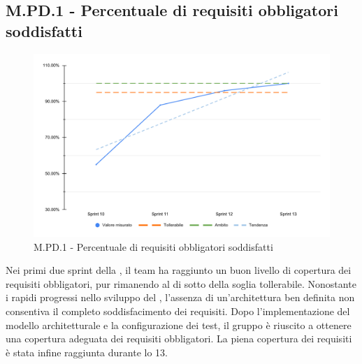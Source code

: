 \subsection{M.PD.1 - Percentuale di requisiti obbligatori soddisfatti}

\begin{figure}[H]
    \centering
    \includegraphics[width=\textwidth]{assets/requisiti_obbligatori_soddisfatti.pdf}
    \caption{M.PD.1 - Percentuale di requisiti obbligatori soddisfatti}
\end{figure}

\par Nei primi due sprint della , il team ha raggiunto un buon livello di copertura dei requisiti obbligatori, pur rimanendo al di sotto della soglia tollerabile. Nonostante i rapidi progressi nello sviluppo del , l'assenza di un'architettura  ben definita non consentiva il completo soddisfacimento dei requisiti. Dopo l'implementazione del modello architetturale e la configurazione dei test, il gruppo è riuscito a ottenere una copertura adeguata dei requisiti obbligatori. La piena copertura dei requisiti è stata infine raggiunta durante lo  13.
